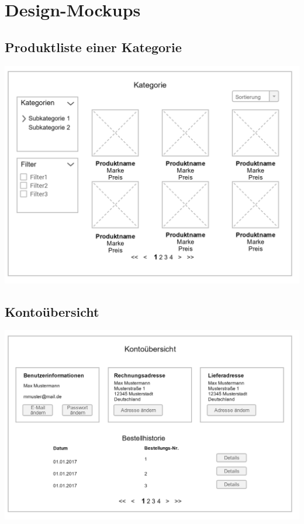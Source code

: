 \section{Design-Mockups}\label{appendix:mockups}
	
\subsection{Produktliste einer Kategorie}
\includegraphics[width=\linewidth]{anhang/webshop_items.png}

\subsection{Kontoübersicht}
\includegraphics[width=\linewidth]{anhang/webshop_account.png}


